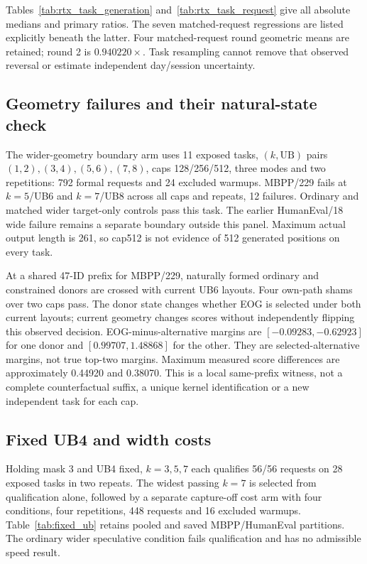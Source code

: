 Tables~\ref{tab:rtx_task_generation} and~\ref{tab:rtx_task_request} give all absolute medians and primary ratios. The seven matched-request regressions are listed explicitly beneath the latter. Four matched-request round geometric means are retained; round 2 is $0.940220\times$. Task resampling cannot remove that observed reversal or estimate independent day/session uncertainty.




\subsection{Geometry failures and their natural-state check}
\label{supp:geometry_boundary}
The wider-geometry boundary arm uses 11 exposed tasks, $(k,\mathrm{UB})$ pairs $(1,2),(3,4),(5,6),(7,8)$, caps 128/256/512, three modes and two repetitions: 792 formal requests and 24 excluded warmups. MBPP/229 fails at $k=5$/UB6 and $k=7$/UB8 across all caps and repeats, 12 failures. Ordinary and matched wider target-only controls pass this task. The earlier HumanEval/18 wide failure remains a separate boundary outside this panel. Maximum actual output length is 261, so cap512 is not evidence of 512 generated positions on every task.

At a shared 47-ID prefix for MBPP/229, naturally formed ordinary and constrained donors are crossed with current UB6 layouts. Four own-path shams over two caps pass. The donor state changes whether EOG is selected under both current layouts; current geometry changes scores without independently flipping this observed decision. EOG-minus-alternative margins are $[-0.09283,-0.62923]$ for one donor and $[0.99707,1.48868]$ for the other. They are selected-alternative margins, not true top-two margins. Maximum measured score differences are approximately 0.44920 and 0.38070. This is a local same-prefix witness, not a complete counterfactual suffix, a unique kernel identification or a new independent task for each cap.

\subsection{Fixed UB4 and width costs}
\label{supp:fixed_ub_width}
Holding mask 3 and UB4 fixed, $k=3,5,7$ each qualifies 56/56 requests on 28 exposed tasks in two repeats. The widest passing $k=7$ is selected from qualification alone, followed by a separate capture-off cost arm with four conditions, four repetitions, 448 requests and 16 excluded warmups. Table~\ref{tab:fixed_ub} retains pooled and saved MBPP/HumanEval partitions. The ordinary wider speculative condition fails qualification and has no admissible speed result.

